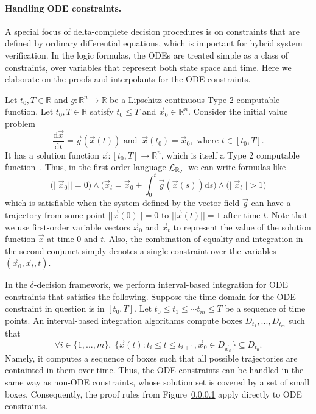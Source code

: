 \paragraph{Handling ODE constraints.} A special focus of delta-complete decision procedures is on constraints that are defined by ordinary differential equations, which is important for hybrid system verification. In the logic formulas, the ODEs are treated simple as a class of constraints, over variables that represent both state space and time. Here we elaborate on the proofs and interpolants for the ODE constraints.  

 Let $t_0, T\in \mathbb{R}$ and $g:\mathbb{R}^n\rightarrow \mathbb{R}$ be a Lipschitz-continuous Type 2 computable function. Let $t_0, T\in \mathbb{R}$ satisfy $t_0\leq T$ and $\vec x_0\in \mathbb{R}^n$. Consider the initial value problem
\[\frac{\mathrm{d}\vec x}{\mathrm{d}t} = \vec g(\vec x(t))\mbox{ and } \ \vec x(t_0) = \vec x_0, \mbox{ where }t\in [t_0, T].\]
It has a solution function $\vec x: [t_0, T]\rightarrow \mathbb{R}^n$, which is itself a Type 2 computable function~\cite{CAbook}. Thus, in the first-order language $\mathcal{L}_{\mathbb{R}_{\mathcal{F}}}$ we can write formulas like
\[\Big(||\vec x_0||=0\Big) \wedge\Big( \vec x_t = \vec x_0+\int_0^t \vec g(\vec x(s))\mathrm{d}s\Big) \wedge\Big(||\vec x_t|| > 1\Big)\]
which is satisfiable when the system defined by the vector field $\vec g$ can have a trajectory from some point $||\vec x(0)||=0$ to $||\vec x(t)||=1$ after time $t$. Note that we use first-order variable vectors $\vec x_0$ and $\vec x_t$ to represent the value of the solution function $\vec x$ at time $0$ and $t$. Also, the combination of equality and integration in the second conjunct simply denotes a single constraint over the variables $(\vec x_0, \vec x_t, t)$. 

In the $\delta$-decision framework, we perform interval-based integration for ODE constraints that satisfies the following. Suppose the time domain for the ODE constraint in question is in $[t_0,T]$. Let $t_0\leq t_1\leq \cdots t_m\leq T$ be a sequence of time points. An interval-based integration algorithms compute boxes $D_{t_1},...,D_{t_m}$ such that 
$$\forall i\in \{1,...,m\},\; \{\vec x(t): t_i\leq t\leq t_{i+1}, \vec x_0\in D_{\vec x_0}\}\subseteq D_{t_0}.$$
Namely, it computes a sequence of boxes such that all possible trajectories are containted in them over time. Thus, the ODE constraints can be handled in the same way as non-ODE constraints, whose solution set is covered by a set of small boxes. Consequently, the proof rules from Figure~\ref{} apply directly to ODE constraints. 




